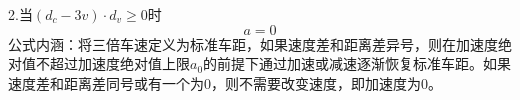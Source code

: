\documentclass[a4paper,12pt]{article}
\numberwithin{equation}{section}
\begin{document}
	2.当$(d_c-3v)\cdot d_v\geq 0$时
	\begin{equation}
		a=0
\end{equation}
	公式内涵：将三倍车速定义为标准车距，如果速度差和距离差异号，则在加速度绝对值不超过加速度绝对值上限$a_0$的前提下通过加速或减速逐渐恢复标准车距。如果速度差和距离差同号或有一个为$0$，则不需要改变速度，即加速度为$0$。
	
\end{document}
